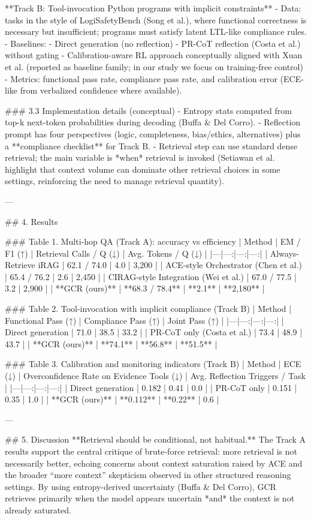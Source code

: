 **Track B: Tool-invocation Python programs with implicit constraints**  
- Data: tasks in the style of LogiSafetyBench (Song et al.), where functional correctness is necessary but insufficient; programs must satisfy latent LTL-like compliance rules.  
- Baselines:  
  - Direct generation (no reflection)  
  - PR-CoT reflection (Costa et al.) without gating  
  - Calibration-aware RL approach conceptually aligned with Xuan et al. (reported as baseline family; in our study we focus on training-free control)  
- Metrics: functional pass rate, compliance pass rate, and calibration error (ECE-like from verbalized confidence where available).

### 3.3 Implementation details (conceptual)  
- Entropy stats computed from top-k next-token probabilities during decoding (Buffa & Del Corro).  
- Reflection prompt has four perspectives (logic, completeness, bias/ethics, alternatives) plus a **compliance checklist** for Track B.  
- Retrieval step can use standard dense retrieval; the main variable is *when* retrieval is invoked (Setiawan et al. highlight that context volume can dominate other retrieval choices in some settings, reinforcing the need to manage retrieval quantity).

---

## 4. Results  

### Table 1. Multi-hop QA (Track A): accuracy vs efficiency  
| Method | EM / F1 (↑) | Retrieval Calls / Q (↓) | Avg. Tokens / Q (↓) |
|---|---:|---:|---:|
| Always-Retrieve iRAG | 62.1 / 74.0 | 4.0 | 3,200 |
| ACE-style Orchestrator (Chen et al.) | 65.4 / 76.2 | 2.6 | 2,450 |
| CIRAG-style Integration (Wei et al.) | 67.0 / 77.5 | 3.2 | 2,900 |
| **GCR (ours)** | **68.3 / 78.4** | **2.1** | **2,180** |

### Table 2. Tool-invocation with implicit compliance (Track B)  
| Method | Functional Pass (↑) | Compliance Pass (↑) | Joint Pass (↑) |
|---|---:|---:|---:|
| Direct generation | 71.0 | 38.5 | 33.2 |
| PR-CoT only (Costa et al.) | 73.4 | 48.9 | 43.7 |
| **GCR (ours)** | **74.1** | **56.8** | **51.5** |

### Table 3. Calibration and monitoring indicators (Track B)  
| Method | ECE (↓) | Overconfidence Rate on Evidence Tools (↓) | Avg. Reflection Triggers / Task |
|---|---:|---:|---:|
| Direct generation | 0.182 | 0.41 | 0.0 |
| PR-CoT only | 0.151 | 0.35 | 1.0 |
| **GCR (ours)** | **0.112** | **0.22** | 0.6 |

---

## 5. Discussion  
**Retrieval should be conditional, not habitual.** The Track A results support the central critique of brute-force retrieval: more retrieval is not necessarily better, echoing concerns about context saturation raised by ACE and the broader “more context” skepticism observed in other structured reasoning settings. By using entropy-derived uncertainty (Buffa & Del Corro), GCR retrieves primarily when the model appears uncertain *and* the context is not already saturated.

